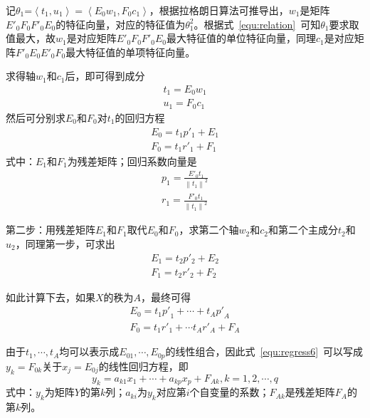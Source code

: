 记${{\theta }_{1}}\text{=}\left\langle {{t}_{1}},{{u}_{1}} \right\rangle =\left\langle {{E}_{0}}{{w}_{1}},{{F}_{0}}{{c}_{1}} \right\rangle$，根据拉格朗日算法可推导出，$w_1$是矩阵${{{E}'}_{0}}{{F}_{0}}{{{F}'}_{0}}{{E}_{0}}$的特征向量，对应的特征值为$\theta _{1}^{2}$。根据式~\ref{equ:relation}~可知$\theta _{1}$要求取值最大，故$w_1$是对应矩阵${{{E}'}_{0}}{{F}_{0}}{{{F}'}_{0}}{{E}_{0}}$最大特征值的单位特征向量，同理$c_1$是对应矩阵${{{F}'}_{0}}{{E}_{0}}{{{E}'}_{0}}{{F}_{0}}$最大特征值的单项特征向量。

求得轴$w_1$和$c_1$后，即可得到成分
\begin{align}
    \label{equ:pc1}
    t_1={E_0}{w_1} \\
    \label{equ:pc2}
    u_1={F_0}{c_1}
\end{align}
然后可分别求$E_0$和$F_0$对$t_1$的回归方程
\begin{align}
    \label{equ:regress1}
    E_0={t_1}{p'_1}+E_1 \\
    \label{equ:regress2}
    F_0={t_1}{r'_1}+F_1
\end{align}
式中：$E_1$和$F_1$为残差矩阵；回归系数向量是
\begin{align}
    \label{equ:regress-index1}
    {{p}_{1}}=\frac{{{{{E}'}}_{0}}{{t}_{1}}}{{{\left\| {{t}_{1}} \right\|}^{2}}} \\
    \label{equ:regress-index2}
    {{r}_{1}}=\frac{{{{{F}'}}_{0}}{{t}_{1}}}{{{\left\| {{t}_{1}} \right\|}^{2}}}
\end{align}
    
第二步：用残差矩阵$E_1$和$F_1$取代$E_0$和$F_0$，求第二个轴$w_2$和$c_2$和第二个主成分$t_2$和$u_2$，同理第一步，可求出
\begin{align}
    \label{equ:regress3}
    E_1={t_2}{p'_2}+E_2 \\
    \label{equ:regress4}
    F_1={t_2}{r'_2}+F_2
\end{align}

如此计算下去，如果$X$的秩为$A$，最终可得
\begin{align}
    \label{equ:regress5}
    {{E}_{0}}={{t}_{1}}{{{p}'}_{1}}+\cdots +{{t}_{A}}{{{p}'}_{A}} \\
    \label{equ:regress6}
    {{F}_{0}}={{t}_{1}}{{{r}'}_{1}}+\cdots {{t}_{A}}{{{r}'}_{A}}+{{F}_{A}}
\end{align}

由于$t_1,\cdots ,t_A$均可以表示成${E}_{01},\cdots ,{E}_{0p}$的线性组合，因此式~\ref{equ:regress6}~可以写成$y_k=F_{0k}$关于$x_j=E_{0j}$的线性回归方程，即
\begin{equation}
    \label{equ:regress7}
    {{y}_{k}}={{a}_{k1}}{{x}_{1}}+\cdots +{{a}_{kp}}{{x}_{p}}+{{F}_{Ak}},k=1,2,\cdots ,q
\end{equation}
式中：$y_k$为矩阵$Y$的第$k$列；$a_{ki}$为$y_k$对应第$i$个自变量的系数；${F}_{Ak}$是残差矩阵$F_A$的第$k$列。

